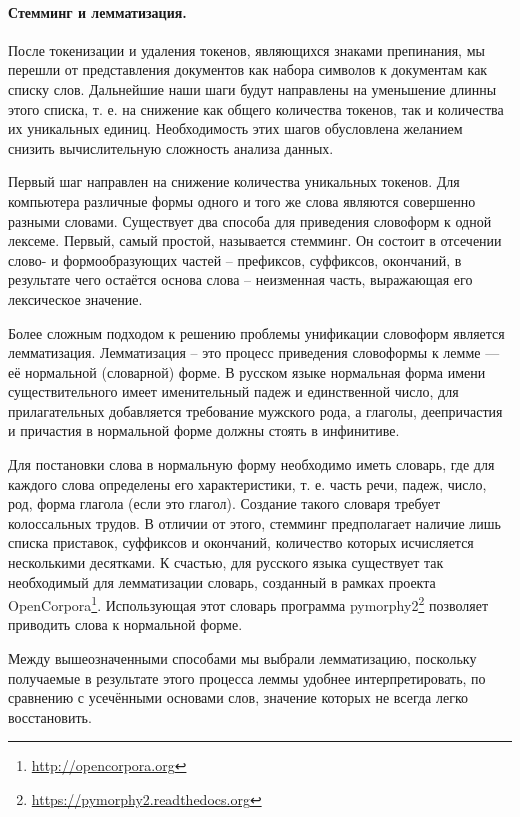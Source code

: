 \paragraph{Стемминг и лемматизация.}
После токенизации и удаления токенов, являющихся знаками препинания, мы перешли от представления документов как набора символов к документам как списку слов. Дальнейшие наши шаги будут направлены на уменьшение длинны этого списка, т. е. на снижение как общего количества токенов, так и количества их уникальных единиц. Необходимость этих шагов обусловлена желанием снизить вычислительную сложность анализа данных.

Первый шаг направлен на снижение количества уникальных токенов. Для компьютера различные формы одного и того же слова являются совершенно разными словами. Существует два способа для приведения словоформ к одной лексеме. Первый, самый простой, называется стемминг. Он состоит в отсечении слово- и формообразующих частей -- префиксов, суффиксов, окончаний, в результате чего остаётся основа слова -- неизменная часть, выражающая его лексическое значение.

Более сложным подходом к решению проблемы унификации словоформ является лемматизация. Лемматизация -- это процесс приведения словоформы к лемме — её нормальной (словарной) форме. В русском языке нормальная форма имени существительного имеет именительный падеж и единственной число, для прилагательных добавляется требование мужского рода, а глаголы, деепричастия и причастия в нормальной форме должны стоять в инфинитиве.

Для постановки слова в нормальную форму необходимо иметь словарь, где для каждого слова определены его характеристики, т. е. часть речи, падеж, число, род, форма глагола (если это глагол). Создание такого словаря требует колоссальных трудов. В отличии от этого, стемминг предполагает наличие лишь списка приставок, суффиксов и окончаний, количество которых исчисляется несколькими десятками. К счастью, для русского языка существует так необходимый для лемматизации словарь, созданный в рамках проекта OpenCorpora\footnote{\href{http://opencorpora.org}{http://opencorpora.org}}. Использующая этот словарь программа pymorphy2\footnote{\href{https://pymorphy2.readthedocs.org}{https://pymorphy2.readthedocs.org}} позволяет приводить слова к нормальной форме.

Между вышеозначенными способами мы выбрали лемматизацию, поскольку получаемые в результате этого процесса леммы удобнее интерпретировать, по сравнению с усечёнными основами слов, значение которых не всегда легко восстановить.

